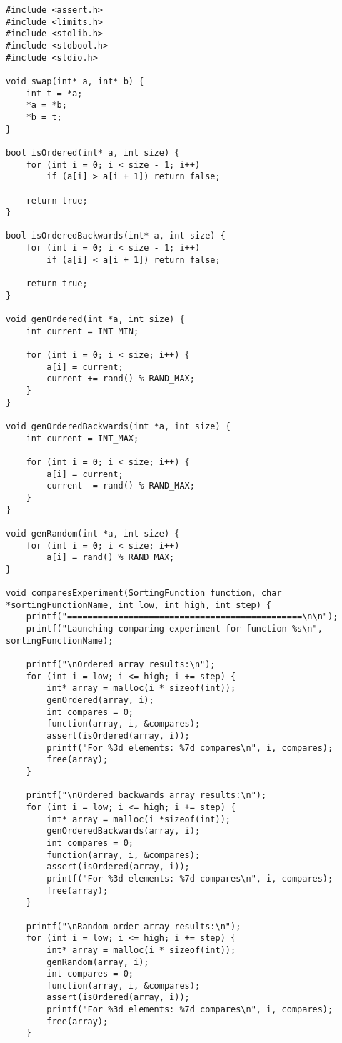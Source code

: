 \documentclass[a4paper,14pt]{extarticle}
\begin{document}
\begin{enumerate}
\begin{verbatim}
#include <assert.h>
#include <limits.h>
#include <stdlib.h>
#include <stdbool.h>
#include <stdio.h>

void swap(int* a, int* b) {
    int t = *a;
    *a = *b;
    *b = t;
}

bool isOrdered(int* a, int size) {
    for (int i = 0; i < size - 1; i++)
        if (a[i] > a[i + 1]) return false;

    return true;
}

bool isOrderedBackwards(int* a, int size) {
    for (int i = 0; i < size - 1; i++) 
        if (a[i] < a[i + 1]) return false;
    
    return true;
}

void genOrdered(int *a, int size) {
    int current = INT_MIN;

    for (int i = 0; i < size; i++) {
        a[i] = current;
        current += rand() % RAND_MAX;
    }
}

void genOrderedBackwards(int *a, int size) {
    int current = INT_MAX;

    for (int i = 0; i < size; i++) {
        a[i] = current;
        current -= rand() % RAND_MAX;
    }
}

void genRandom(int *a, int size) {
    for (int i = 0; i < size; i++)
        a[i] = rand() % RAND_MAX;
}

void comparesExperiment(SortingFunction function, char *sortingFunctionName, int low, int high, int step) {
    printf("==============================================\n\n");
    printf("Launching comparing experiment for function %s\n", sortingFunctionName);

    printf("\nOrdered array results:\n");
    for (int i = low; i <= high; i += step) {
        int* array = malloc(i * sizeof(int));
        genOrdered(array, i);
        int compares = 0;
        function(array, i, &compares);
        assert(isOrdered(array, i));
        printf("For %3d elements: %7d compares\n", i, compares);
        free(array);
    }

    printf("\nOrdered backwards array results:\n");
    for (int i = low; i <= high; i += step) {
        int* array = malloc(i *sizeof(int));
        genOrderedBackwards(array, i);
        int compares = 0;
        function(array, i, &compares);
        assert(isOrdered(array, i));
        printf("For %3d elements: %7d compares\n", i, compares);
        free(array);
    }

    printf("\nRandom order array results:\n");
    for (int i = low; i <= high; i += step) {
        int* array = malloc(i * sizeof(int));
        genRandom(array, i);
        int compares = 0;
        function(array, i, &compares);
        assert(isOrdered(array, i));
        printf("For %3d elements: %7d compares\n", i, compares);
        free(array);
    }


\end{verbatim}
\end{enumerate}
\end{document}
